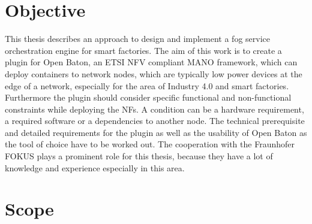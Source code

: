\section{Objective}



This thesis describes an approach to design and implement a fog service orchestration engine for smart factories.
The aim of this work is to create a plugin for Open Baton, an \ac{ETSI} \ac{NFV} compliant \ac{MANO} framework, which can deploy containers to network nodes, which are typically low power devices at the edge of a network, especially for the area of Industry 4.0 and smart factories.
Furthermore the plugin should consider specific functional and non-functional constraints while deploying the \acp{NF}.
A condition can be a hardware requirement, a required software or a dependencies to another node.
The technical prerequisite and detailed requirements for the plugin as well as the usability of Open Baton as the tool of choice have to be worked out.
The cooperation with the Fraunhofer FOKUS plays a prominent role for this thesis, because they have a lot of knowledge and experience especially in this area.


\section{Scope}



